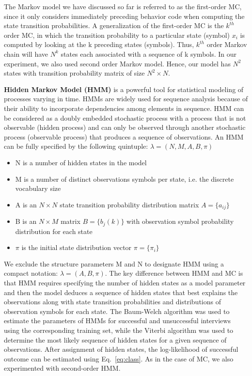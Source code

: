 \documentclass{amia_summit_2018}
\begin{document}
The Markov model we have discussed so far is referred to as the first-order MC, since it only considers immediately preceding behavior code when computing the state transition probabilities. A generalization of the first-order MC is the $k^{th}$ order MC, in which the transition probability to a particular state (symbol) $x_i$ is computed by looking at the k preceding states (symbols). Thus, $k^{th}$ order Markov chain will have $N^{k}$ states each associated with a sequence of k symbols. In our experiment, we also used second order Markov model. Hence, our model has $N^2$ states with transition probability matrix of size $N^2 \times N$.  

\textbf {Hidden Markov Model (HMM)} is a powerful tool for statistical modeling of processes varying in time. HMMs are widely used for sequence analysis because of their ability to incorporate dependencies among elements in sequence. HMM can be considered as a doubly embedded stochastic process with a process that is not observable (hidden process) and can only be observed through another stochastic process (observable process) that produces a sequence of observations. An HMM can be fully specified by the following quintuple: $\lambda = (N, M, A, B, \pi)$

\begin{itemize}
\item N is a number of hidden states in the model
\item M is a number of distinct observations symbols per state, i.e. the discrete vocabulary size
\item A is an $N\times N$ state transition probability distribution matrix $A = \{a_{ij}\}$
\item B is an $N\times M$ matrix $B = \{b_j(k)\}$ with observation symbol probability distribution for each state 
\item $\pi$ is the initial state distribution vector $\pi = \{\pi_i\}$
\end{itemize}

We exclude the structure parameters M and N to designate HMM using a compact notation: $\lambda = (A, B, \pi)$. The key difference between HMM and MC is that HMM requires specifying the number of hidden states as a model parameter and then the model deduces a sequence of hidden states that best explains the observations along with state transition probabilities and distributions of observation symbols for each state. The Baum-Welch algorithm was used to estimate the parameters of HMMs for successful and unsuccessful interviews using the corresponding training set, while the Viterbi algorithm was used to determine the most likely sequence of hidden states for a given sequence of observations. After assignment of hidden states, the log-likelihood of successful outcome can be estimated using Eq.~\ref{eq:class}. As in the case of MC, we also experimented with second-order HMM.
\end{document}
